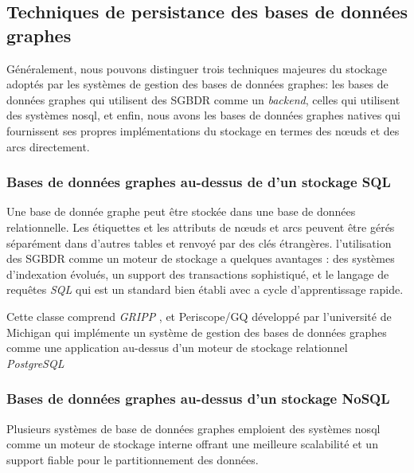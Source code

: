 \newpage
  \subsection{Techniques de persistance des bases de données graphes}
  \label{sec:persistence-tech}
  Généralement, nous pouvons distinguer trois techniques majeures du
  stockage adoptés par les systèmes de gestion des bases de données
  graphes: les bases de données graphes qui utilisent des
  \acrshort{SGBDR} comme un \emph{backend}, celles qui utilisent des
  systèmes \acrshort{nosql}, et enfin, nous avons les bases de données
  graphes natives qui fournissent ses propres implémentations du
  stockage en termes des nœuds et des arcs directement.

    \subsubsection{Bases de données graphes au-dessus de d'un stockage  SQL}
    \label{sec:graphdb-over-sql}
    Une base de donnée graphe peut être stockée dans une base de
    données relationnelle. Les étiquettes et les attributs de nœuds et
    arcs peuvent être gérés séparément dans d'autres tables et renvoyé
    par des clés étrangères. l'utilisation des \acrshort{SGBDR} comme
    un moteur de stockage a quelques avantages : des systèmes
    d'indexation évolués, un support des transactions sophistiqué, et
    le langage de requêtes \emph{SQL} qui est un standard bien établi
    avec a cycle d'apprentissage rapide.


    Cette classe comprend \emph{GRIPP} \cite{trissl2007fast}, et
    Periscope/GQ \cite{tian2008periscope} développé par l'université
    de Michigan qui implémente un système de gestion des bases de
    données graphes comme une application au-dessus d'un moteur de
    stockage relationnel \emph{PostgreSQL}

    \subsubsection{Bases de données graphes au-dessus d'un stockage NoSQL}
    \label{sec:graphdb-over-nosql}
    Plusieurs systèmes de base de données graphes emploient des
    systèmes \acrshort{nosql} comme un moteur de stockage interne
    offrant une meilleure scalabilité et un support fiable pour le
    partitionnement des données.

